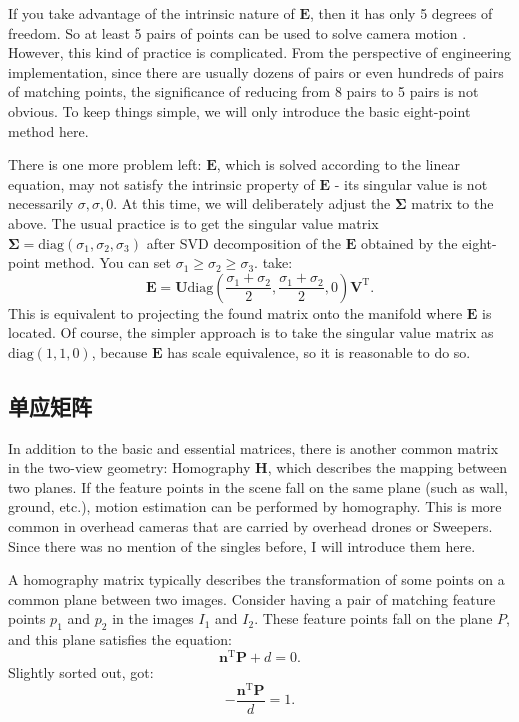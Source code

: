 If you take advantage of the intrinsic nature of $\bm{E}$, then it has only 5 degrees of freedom. So at least 5 pairs of points can be used to solve camera motion \textsuperscript{\cite{Li2006, Nister2004a}}. However, this kind of practice is complicated. From the perspective of engineering implementation, since there are usually dozens of pairs or even hundreds of pairs of matching points, the significance of reducing from 8 pairs to 5 pairs is not obvious. To keep things simple, we will only introduce the basic eight-point method here.

There is one more problem left: $\bm{E}$, which is solved according to the linear equation, may not satisfy the intrinsic property of $\bm{E}$ - its singular value is not necessarily ${\sigma}, {\sigma}, 0$. At this time, we will deliberately adjust the $\bm{\Sigma}$ matrix to the above. The usual practice is to get the singular value matrix $\bm{\Sigma} = \mathrm{diag} ( \sigma_1, \sigma_2, \sigma_3)$ after SVD decomposition of the $\bm{E}$ obtained by the eight-point method. You can set $\sigma_1 \geqslant \sigma_2 \geqslant \sigma_3$. take:
\begin{equation}
\bm{E} = \bm{U} \mathrm{diag} (\frac{\sigma_1+\sigma_2}{2}, \frac{\sigma_1+\sigma_2}{2}, 0) \bm{V}^\mathrm{T}.
\end{equation}
This is equivalent to projecting the found matrix onto the manifold where $\bm{E}$ is located. Of course, the simpler approach is to take the singular value matrix as $\mathrm{diag} (1,1,0)$, because $\bm{E}$ has scale equivalence, so it is reasonable to do so.
\subsection{单应矩阵}
In addition to the basic and essential matrices, there is another common matrix in the two-view geometry: Homography $\bm{H}$, which describes the mapping between two planes. If the feature points in the scene fall on the same plane (such as wall, ground, etc.), motion estimation can be performed by homography. This is more common in overhead cameras that are carried by overhead drones or Sweepers. Since there was no mention of the singles before, I will introduce them here.

A homography matrix typically describes the transformation of some points on a common plane between two images. Consider having a pair of matching feature points $p_{1}$ and $p_{2}$ in the images $I_{1}$ and $I_{2}$. These feature points fall on the plane $P$, and this plane satisfies the equation:
\begin{equation}
\bm{n}^\mathrm{T} \bm{P} + d = 0.
\end{equation}
Slightly sorted out, got:
\begin{equation}
- \frac{\bm{n}^\mathrm{T} \bm{P} }{d} = 1.
\end{equation}

